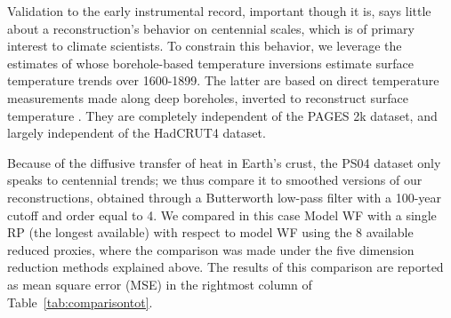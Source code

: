 \documentclass[12pt]{amsart}
\theoremstyle{plain}
\theoremstyle{definition}
\theoremstyle{remark}
\begin{document}
Validation to the early instrumental record, important though it is, says little about a reconstruction's behavior on centennial scales, which is of primary interest to climate scientists. To constrain this behavior, we leverage the estimates of \citet[hereafter, PS04]{Pollack2004} whose borehole-based
temperature inversions estimate surface temperature trends over 1600-1899.  The latter are based on direct temperature measurements made along deep boreholes, inverted to reconstruct surface temperature \citep{HuangPollackShen:2000}. They are completely independent of the PAGES 2k dataset, and largely independent of the HadCRUT4 dataset. 

Because of the diffusive transfer of heat in Earth's crust, the PS04 dataset only speaks to centennial trends; we thus compare it to smoothed versions of our reconstructions, obtained through a Butterworth low-pass filter with a 100-year cutoff and order equal to 4. We compared in this case Model WF with a single RP (the longest available) with respect to model WF using the 8 available reduced proxies, where the comparison was made under the five dimension reduction methods explained above. The results of this comparison are reported as mean square error (MSE) in the rightmost column of Table~\ref{tab:comparisontot}.
\end{document}
